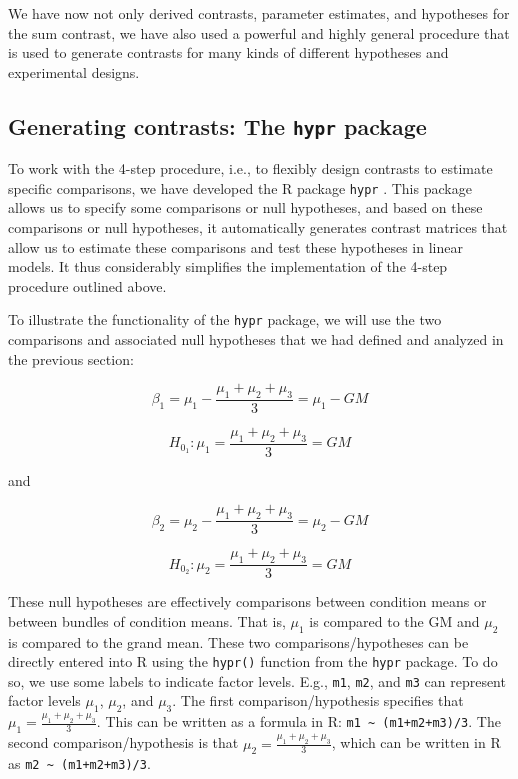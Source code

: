 \documentclass[12pt,]{krantz}
\theoremstyle{definition}
\theoremstyle{definition}
\theoremstyle{definition}
\theoremstyle{remark}
\begin{document}
We have now not only derived contrasts, parameter estimates, and
hypotheses for the sum contrast, we have also used a powerful and highly
general procedure that is used to generate contrasts for many kinds of
different hypotheses and experimental designs.

\subsection{\texorpdfstring{Generating contrasts: The \texttt{hypr}
package}{Generating contrasts: The hypr package}}\label{generating-contrasts-the-hypr-package}

To work with the 4-step procedure, i.e., to flexibly design contrasts to
estimate specific comparisons, we have developed the R package
\texttt{hypr} \citep{rabe2020hypr}. This package allows us to specify
some comparisons or null hypotheses, and based on these comparisons or
null hypotheses, it automatically generates contrast matrices that allow
us to estimate these comparisons and test these hypotheses in linear
models. It thus considerably simplifies the implementation of the 4-step
procedure outlined above.

To illustrate the functionality of the \texttt{hypr} package, we will
use the two comparisons and associated null hypotheses that we had
defined and analyzed in the previous section:

\begin{equation}
\beta_1 = \mu_1 - \frac{\mu_1+\mu_2+\mu_3}{3} = \mu_1 - GM
\end{equation}

\begin{equation}
H_{0_1}: \mu_1 = \frac{\mu_1+\mu_2+\mu_3}{3} = GM
\end{equation}

\noindent
and

\begin{equation}
\beta_2 = \mu_2 - \frac{\mu_1+\mu_2+\mu_3}{3} = \mu_2 - GM
\end{equation}

\begin{equation}
H_{0_2}: \mu_2 = \frac{\mu_1+\mu_2+\mu_3}{3} = GM
\end{equation}

These null hypotheses are effectively comparisons between condition
means or between bundles of condition means. That is, \(\mu_1\) is
compared to the GM and \(\mu_2\) is compared to the grand mean. These
two comparisons/hypotheses can be directly entered into R using the
\texttt{hypr()} function from the \texttt{hypr} package. To do so, we
use some labels to indicate factor levels. E.g., \texttt{m1},
\texttt{m2}, and \texttt{m3} can represent factor levels \(\mu_1\),
\(\mu_2\), and \(\mu_3\). The first comparison/hypothesis specifies that
\(\mu_1 = \frac{\mu_1+\mu_2+\mu_3}{3}\). This can be written as a
formula in R: \texttt{m1\ \textasciitilde{}\ (m1+m2+m3)/3}. The second
comparison/hypothesis is that \(\mu_2 = \frac{\mu_1+\mu_2+\mu_3}{3}\),
which can be written in R as
\texttt{m2\ \textasciitilde{}\ (m1+m2+m3)/3}.
\end{document}
